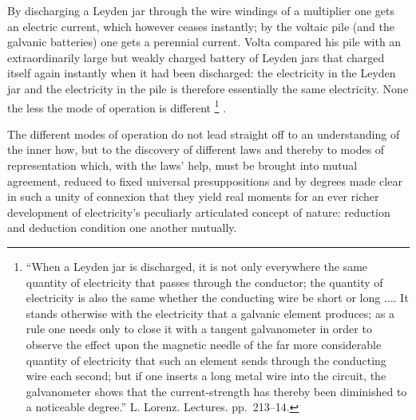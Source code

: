 \documentclass[12pt,a4paper]{book}
\renewcommand{\thefootnote}{*)}
\begin{document}
By discharging a Leyden jar through the wire windings of a multiplier one gets an electric current, which however ceases
instantly; by the voltaic pile (and the galvanic batteries) one gets a perennial current. Volta compared his pile with an
extraordinarily large but weakly charged battery of Leyden jars that charged itself again instantly when it had been
discharged: the electricity in the Leyden jar and the electricity in the pile is therefore essentially the same
electricity. None the less the mode of operation is different%
\renewcommand{\thefootnote}{**)}%
\footnote{%
``When a Leyden jar is discharged, it is not only everywhere the same quantity of electricity that passes through the
conductor; the quantity of electricity is also the same whether the conducting wire be
short or long .... It stands otherwise with the electricity that a galvanic element produces; as a rule one needs only
to close it with a tangent galvanometer in order to observe the effect upon the magnetic needle of the far more
considerable quantity of electricity that such an element sends through the conducting wire each second; but if one
inserts a long metal wire into the circuit, the galvanometer shows that the current-strength has thereby been diminished
to a noticeable degree.'' L. Lorenz. Lectures. pp.\ 213--14.}%
\renewcommand{\thefootnote}{*)}%
.

The different modes of operation do not lead straight off to an understanding of the inner how, but to the discovery of
different laws and thereby to modes of representation which, with the laws' help, must be brought into mutual agreement,
reduced to fixed universal presuppositions and by degrees made clear in such a unity of connexion that they yield real
moments for an ever richer development of electricity's peculiarly articulated concept of nature: reduction and deduction
condition one another mutually.
\end{document}
